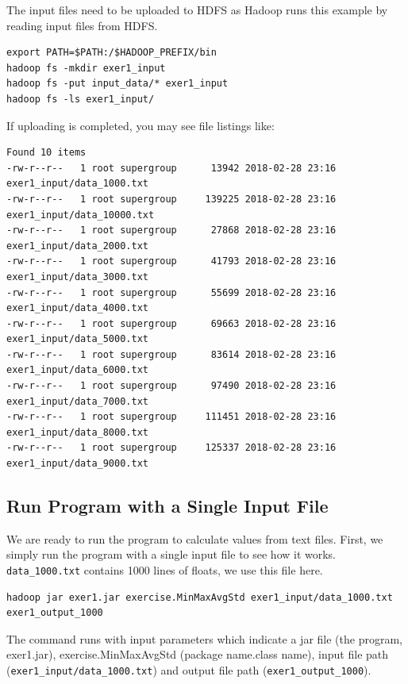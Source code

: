The input files need to be uploaded to HDFS as Hadoop runs this example by
reading input files from HDFS.

\begin{lstlisting}
export PATH=$PATH:/$HADOOP_PREFIX/bin
hadoop fs -mkdir exer1_input
hadoop fs -put input_data/* exer1_input
hadoop fs -ls exer1_input/
\end{lstlisting}

If uploading is completed, you may see file listings like:

\begin{lstlisting}
Found 10 items
-rw-r--r--   1 root supergroup      13942 2018-02-28 23:16 exer1_input/data_1000.txt
-rw-r--r--   1 root supergroup     139225 2018-02-28 23:16 exer1_input/data_10000.txt
-rw-r--r--   1 root supergroup      27868 2018-02-28 23:16 exer1_input/data_2000.txt
-rw-r--r--   1 root supergroup      41793 2018-02-28 23:16 exer1_input/data_3000.txt
-rw-r--r--   1 root supergroup      55699 2018-02-28 23:16 exer1_input/data_4000.txt
-rw-r--r--   1 root supergroup      69663 2018-02-28 23:16 exer1_input/data_5000.txt
-rw-r--r--   1 root supergroup      83614 2018-02-28 23:16 exer1_input/data_6000.txt
-rw-r--r--   1 root supergroup      97490 2018-02-28 23:16 exer1_input/data_7000.txt
-rw-r--r--   1 root supergroup     111451 2018-02-28 23:16 exer1_input/data_8000.txt
-rw-r--r--   1 root supergroup     125337 2018-02-28 23:16 exer1_input/data_9000.txt
\end{lstlisting}

\subsection{Run Program with a Single Input File}

We are ready to run the program to calculate values from text
files. First, we simply run the program with a single input file to
see how it works.  \verb|data_1000.txt| contains 1000 lines of
floats, we use this file here.

\begin{lstlisting}
hadoop jar exer1.jar exercise.MinMaxAvgStd exer1_input/data_1000.txt exer1_output_1000
\end{lstlisting}

The command runs with input parameters which indicate a jar file (the
program, exer1.jar), exercise.MinMaxAvgStd (package name.class name),
input file path (\verb|exer1_input/data_1000.txt|) and output file path
(\verb|exer1_output_1000|).

